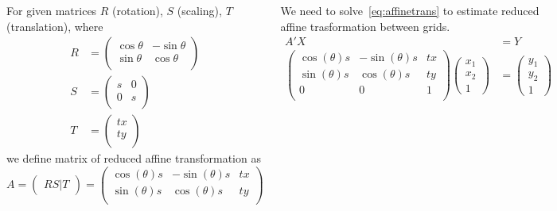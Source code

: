 \documentclass[17pt, a0paper, portrait]{tikzposter}
\begin{document}
\begin{columns}
{\begin{defn}
For given matrices $R$ (rotation), $S$ (scaling), $T$ (translation), where
\begin{align}
    R &=
    \begin{pmatrix}
        \cos{\theta} & -\sin{\theta} \\
        \sin{\theta} & \cos{\theta} \\
    \end{pmatrix} \\
    S &=
    \begin{pmatrix}
        s & 0 \\
        0 & s \\
    \end{pmatrix} \\
    T &=
    \begin{pmatrix}
        tx \\
        ty \\
    \end{pmatrix}
\end{align}
we define matrix of reduced affine transformation as
\begin{equation}
    A =
    \begin{pmatrix}
        RS|T
    \end{pmatrix}
    =
    \begin{pmatrix}
        \cos(\theta)s & -\sin(\theta)s & tx \\
        \sin(\theta)s & \cos(\theta)s & ty \\
    \end{pmatrix}
\end{equation}
\end{defn}

\vspace{1em}
We need to solve~\eqref{eq:affinetrans} to estimate reduced affine trasformation between grids.
\begin{align}
    A'X &= Y \label{eq:affinetrans}\\
    \begin{pmatrix}
        \cos(\theta)s & -\sin(\theta)s & tx \\
        \sin(\theta)s & \cos(\theta)s & ty \\
        0 & 0 & 1 \\
    \end{pmatrix}
    \begin{pmatrix}
        x_1 \\
        x_2 \\
        1
    \end{pmatrix}
    &=
    \begin{pmatrix}
        y_1 \\
        y_2 \\
        1
    \end{pmatrix}
\end{align}


}
\end{columns}
\end{document}
